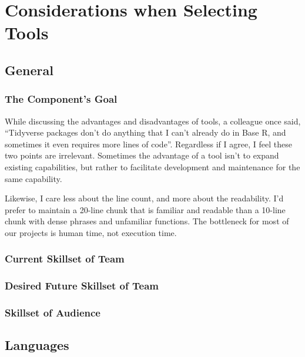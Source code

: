\documentclass[]{book}
\begin{document}
\hypertarget{tools}{%
\chapter{Considerations when Selecting Tools}\label{tools}}

\hypertarget{general}{%
\section{General}\label{general}}

\hypertarget{the-components-goal}{%
\subsection{The Component's Goal}\label{the-components-goal}}

While discussing the advantages and disadvantages of tools, a colleague once said, ``Tidyverse packages don't do anything that I can't already do in Base R, and sometimes it even requires more lines of code''. Regardless if I agree, I feel these two points are irrelevant. Sometimes the advantage of a tool isn't to expand existing capabilities, but rather to facilitate development and maintenance for the same capability.

Likewise, I care less about the line count, and more about the readability. I'd prefer to maintain a 20-line chunk that is familiar and readable than a 10-line chunk with dense phrases and unfamiliar functions. The bottleneck for most of our projects is human time, not execution time.

\hypertarget{current-skillset-of-team}{%
\subsection{Current Skillset of Team}\label{current-skillset-of-team}}

\hypertarget{desired-future-skillset-of-team}{%
\subsection{Desired Future Skillset of Team}\label{desired-future-skillset-of-team}}

\hypertarget{skillset-of-audience}{%
\subsection{Skillset of Audience}\label{skillset-of-audience}}

\hypertarget{languages}{%
\section{Languages}\label{languages}}
\end{document}
